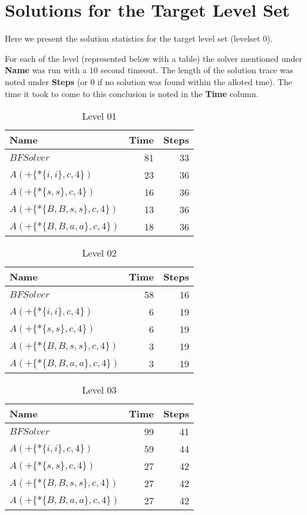 \chapter{Solutions for the Target Level Set}
\label{app:solutions}

Here we present the solution statistics for the target level set
(levelset 0).

For each of the level (represented below with a table) the solver
mentioned under \textbf{Name} was run with a $10$ second timeout.  The
length of the solution trace was noted under \textbf{Steps} (or $0$ if
no solution was found within the alloted tme). The time it took to
come to this conclusion is noted in the \textbf{Time} column.

\begin{table}
  \centering
  \begin{tabular}{lrr}
    \toprule
    \textbf{ Name } & \textbf{ Time } & \textbf{ Steps }\\\midrule
    $BFSolver$ & 81 & 33 \\
    $A(+\{*\{i,i\},c,4\})$ & 23 & 36 \\
    $A(+\{*\{s,s\},c,4\})$ & 16 & 36 \\
    $A(+\{*\{B,B,s,s\},c,4\})$ & 13 & 36 \\
    $A(+\{*\{B,B,a,a\},c,4\})$ & 18 & 36 \\
    \bottomrule
  \end{tabular}
  \caption{Level 01}
  \label{tab:level_01}
\end{table}

\begin{table} \centering \begin{tabular}{lrr}\toprule \textbf{ Name }
    & \textbf{ Time } & \textbf{ Steps }\\\midrule
    $BFSolver$ & 58 & 16 \\
    $A(+\{*\{i,i\},c,4\})$ & 6 & 19 \\
    $A(+\{*\{s,s\},c,4\})$ & 6 & 19 \\
    $A(+\{*\{B,B,s,s\},c,4\})$ & 3 & 19 \\
    $A(+\{*\{B,B,a,a\},c,4\})$ & 3 & 19 \\
    \bottomrule \end{tabular} \caption{Level 02}
  \label{tab:level_02} \end{table}

\begin{table} \centering \begin{tabular}{lrr}\toprule \textbf{ Name }
    & \textbf{ Time } & \textbf{ Steps }\\\midrule
    $BFSolver$ & 99 & 41 \\
    $A(+\{*\{i,i\},c,4\})$ & 59 & 44 \\
    $A(+\{*\{s,s\},c,4\})$ & 27 & 42 \\
    $A(+\{*\{B,B,s,s\},c,4\})$ & 27 & 42 \\
    $A(+\{*\{B,B,a,a\},c,4\})$ & 27 & 42 \\
    \bottomrule \end{tabular} \caption{Level 03}
  \label{tab:level_03} \end{table}

